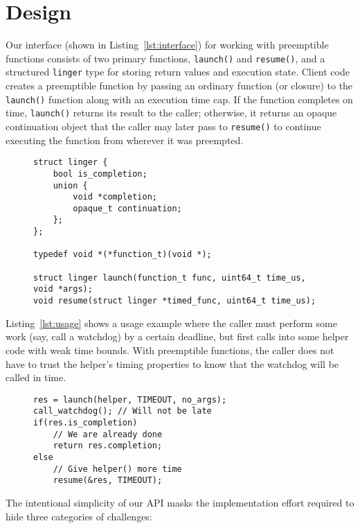 \section{Design}

Our interface (shown in Listing~\ref{lst:interface}) for working with
preemptible functions consists of two primary functions, \texttt{launch()} and
\texttt{resume()}, and a structured \texttt{linger} type for storing return values
and execution state.  Client code creates a preemptible function by passing an
ordinary function (or closure) to the \texttt{launch()} function along with an
execution time cap.  If the function completes on time,
\texttt{launch()} returns its result to the caller; otherwise, it returns an opaque
continuation object that the caller may later pass to \texttt{resume()} to continue
executing the function from wherever it was preempted.

\begin{figure}
\begin{lstlisting}[label=lst:interface,caption=Preemptible functions C-language interface]
struct linger {
	bool is_completion;
	union {
		void *completion;
		opaque_t continuation;
	};
};

typedef void *(*function_t)(void *);

struct linger launch(function_t func, uint64_t time_us, void *args);
void resume(struct linger *timed_func, uint64_t time_us);
\end{lstlisting}
\end{figure}

Listing~\ref{lst:usage} shows a usage example where the caller must
perform some work (say, call a watchdog) by a certain deadline, but first
calls into some helper code with weak time bounds.  With preemptible functions,
the caller does not have to trust the helper's timing properties to know that the
watchdog will be called
in time.

\begin{figure}
\begin{lstlisting}[label=lst:usage,caption=Preemptible function usage example]
res = launch(helper, TIMEOUT, no_args);
call_watchdog(); // Will not be late
if(res.is_completion)
	// We are already done
	return res.completion;
else
	// Give helper() more time
	resume(&res, TIMEOUT);
\end{lstlisting}
\end{figure}

The intentional simplicity of our API masks the implementation effort required to
hide three categories of challenges:

